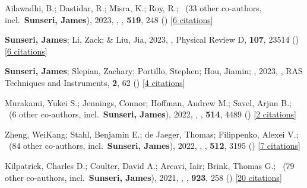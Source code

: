 \item Ailawadhi, B.; Dastidar, R.; Misra, K.; Roy, R.; \etal\ ({33} other co-authors, incl.\ \textbf{Sunseri, James}), 2023, , \mnras, \textbf{519}, 248 () [\href{https://ui.adsabs.harvard.edu/abs/2023MNRAS.519..248A}{6 citations}]

\item \textbf{Sunseri, James}; Li, Zack; \& Liu, Jia, 2023, , Physical Review D, \textbf{107}, 23514 () [\href{https://ui.adsabs.harvard.edu/abs/2023PhRvD.107b3514S}{6 citations}]

\item \textbf{Sunseri, James}; Slepian, Zachary; Portillo, Stephen; Hou, Jiamin; \etal, 2023, , RAS Techniques and Instruments, \textbf{2}, 62 () [\href{https://ui.adsabs.harvard.edu/abs/2023RASTI...2...62S}{4 citations}]

\item Murakami, Yukei S.; Jennings, Connor; Hoffman, Andrew M.; Savel, Arjun B.; \etal\ ({6} other co-authors, incl.\ \textbf{Sunseri, James}), 2022, , \mnras, \textbf{514}, 4489 () [\href{https://ui.adsabs.harvard.edu/abs/2022MNRAS.514.4489M}{2 citations}]

\item Zheng, WeiKang; Stahl, Benjamin E.; de Jaeger, Thomas; Filippenko, Alexei V.; \etal\ ({84} other co-authors, incl.\ \textbf{Sunseri, James}), 2022, , \mnras, \textbf{512}, 3195 () [\href{https://ui.adsabs.harvard.edu/abs/2022MNRAS.512.3195Z}{7 citations}]

\item Kilpatrick, Charles D.; Coulter, David A.; Arcavi, Iair; Brink, Thomas G.; \etal\ ({79} other co-authors, incl.\ \textbf{Sunseri, James}), 2021, , \apj, \textbf{923}, 258 () [\href{https://ui.adsabs.harvard.edu/abs/2021ApJ...923..258K}{20 citations}]